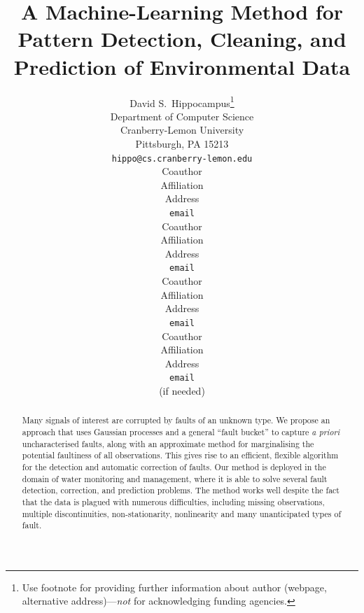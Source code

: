 \documentclass{article} %
\title{A Machine-Learning Method for Pattern Detection, Cleaning, and
Prediction of Environmental Data}
\begin{document}
\maketitle

\author{
David S.~Hippocampus\thanks{ Use footnote for providing further information
about author (webpage, alternative address)---\emph{not} for acknowledging
funding agencies.} \\
Department of Computer Science\\
Cranberry-Lemon University\\
Pittsburgh, PA 15213 \\
\texttt{hippo@cs.cranberry-lemon.edu} \\
\And
Coauthor \\
Affiliation \\
Address \\
\texttt{email} \\
\AND
Coauthor \\
Affiliation \\
Address \\
\texttt{email} \\
\And
Coauthor \\
Affiliation \\
Address \\
\texttt{email} \\
\And
Coauthor \\
Affiliation \\
Address \\
\texttt{email} \\
(if needed)\\
}

\begin{abstract}
Many signals of interest are corrupted by faults of an unknown
type. We propose an approach that uses Gaussian processes and a
general ``fault bucket'' to capture \textit{a priori} uncharacterised
faults, along with an approximate method for marginalising the
potential faultiness of all observations. This gives rise to an
efficient, flexible algorithm for the detection and automatic
correction of faults. Our method is deployed in the domain of water
monitoring and management, where it is able to solve several fault
detection, correction, and prediction problems. The method works well
despite the fact that the data is plagued with numerous difficulties,
including missing observations, multiple discontinuities,
non-stationarity, nonlinearity and many unanticipated types of fault.
\end{abstract}
\end{document}
